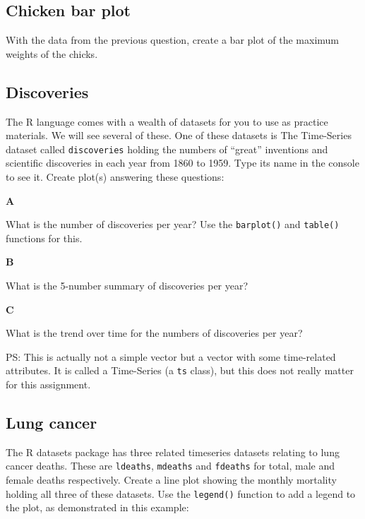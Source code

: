 \documentclass[]{book}
\begin{document}
\hypertarget{chicken-bar-plot}{%
\subsection{Chicken bar plot}\label{chicken-bar-plot}}

With the data from the previous question, create a bar plot of the maximum weights of the chicks.

\hypertarget{discoveries}{%
\subsection{Discoveries}\label{discoveries}}

The R language comes with a wealth of datasets for you to use as practice materials. We will see several of these. One of these datasets is The Time-Series dataset called \texttt{discoveries} holding the numbers of ``great'' inventions and scientific discoveries in each year from 1860 to 1959. Type its name in the console to see it. Create plot(s) answering these questions:

\textbf{A}

What is the number of discoveries per year? Use the \texttt{barplot()} and \texttt{table()} functions for this.

\textbf{B}

What is the 5-number summary of discoveries per year?

\textbf{C}

What is the trend over time for the numbers of discoveries per year?

PS: This is actually not a simple vector but a vector with some time-related attributes. It is called a Time-Series (a \texttt{ts} class), but this does not really matter for this assignment.

\hypertarget{lung-cancer}{%
\subsection{Lung cancer}\label{lung-cancer}}

The R datasets package has three related timeseries datasets relating to lung cancer deaths. These are \texttt{ldeaths}, \texttt{mdeaths} and \texttt{fdeaths} for total, male and female deaths respectively. Create a line plot showing the monthly mortality holding all three of these datasets. Use the \texttt{legend()} function to add a legend to the plot, as demonstrated in this example:
\end{document}

